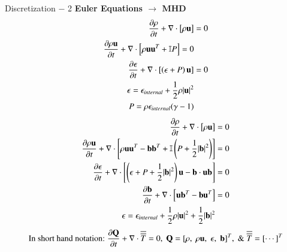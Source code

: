 \begin{frame}[t]{Discretization $-$ 2}
  \minipage{\textwidth}
    \textbf{Euler Equations $\rightarrow$ MHD}
      \begin{align*}
        \frac{\partial \rho}{\partial t} + \nabla \cdot \left[\rho \mathbf{u}\right] &= 0 \\
        \frac{\partial \rho \mathbf{u}}{\partial t} + \nabla \cdot \left[\rho \mathbf{u}\mathbf{u}^T + \mathbb{I}P\right] = 0 \\
        \frac{\partial \epsilon}{\partial t} + \nabla \cdot \left[\left(\epsilon + P \right)\mathbf{u}\right] &= 0 \\
        \epsilon = \epsilon_{internal} + \frac{1}{2}\rho|\mathbf{u}|^2 &\\
        P = \rho \epsilon_{internal} (\gamma - 1) &
      \end{align*}
    \endminipage\hfill
      \begin{align*}
        \frac{\partial \rho}{\partial t} + \nabla \cdot \left[\rho \mathbf{u}\right] &= 0 \\
        \frac{\partial \rho \mathbf{u}}{\partial t} + \nabla \cdot \left[\rho \mathbf{u}\mathbf{u}^T - \mathbf{b}\mathbf{b}^T + \mathbb{I}\left(P + \frac{1}{2}|\mathbf{b}|^2\right)\right] &= 0 \\
        \frac{\partial \epsilon}{\partial t} + \nabla \cdot \left[\left(\epsilon + P + \frac{1}{2}|\mathbf{b}|^2\right)\mathbf{u}- \mathbf{b}\cdot\mathbf{u}\mathbf{b}\right] &= 0 \\
        \frac{\partial \mathbf{b}}{\partial t} + \nabla\cdot\left[\mathbf{u}\mathbf{b}^T-\mathbf{b}\mathbf{u}^T\right] &= 0\\
        \epsilon = \epsilon_{internal} + \frac{1}{2}\rho|\mathbf{u}|^2 + \frac{1}{2}|\mathbf{b}|^2 
      \end{align*}
    \endminipage\hfill
  \endminipage
  \begin{equation*}
    \text{In short hand notation:}\;\frac{\partial \mathbf{Q}}{\partial t} + \nabla \cdot \overline{\overline{T}} = 0, \; \mathbf{Q} = [\rho,\;\rho \mathbf{u},\; \epsilon,\;\mathbf{b}]^T, \; \&\; \overline{\overline{T}} = [\cdots]^T
  \end{equation*}
\end{frame}

